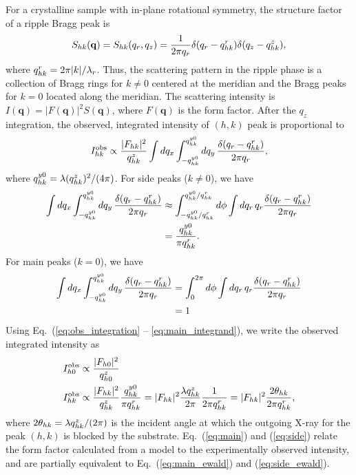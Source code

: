 For a crystalline sample with in-plane rotational symmetry, the
structure factor of a ripple Bragg peak is  
\begin{equation}
  S_{hk}(\mathbf{q}) = S_{hk}(q_r,q_z) 
  = \frac{1}{2\pi q_r}\delta(q_r-q_{hk}^r)\delta(q_z-q_{hk}^z),
\end{equation} 
where $q_{hk}^r=2\pi |k|/\lambda_r$. Thus, the scattering pattern in the 
ripple phase is a 
collection of Bragg rings for $k\neq 0$ centered at the meridian and the 
Bragg peaks for $k=0$ located along the meridian.  
The scattering intensity is $I(\mathbf{q})=|F(\mathbf{q})|^2S(\mathbf{q})$,
where $F(\mathbf{q})$ is the form factor. After the $q_z$ integration,
the observed, integrated intensity of $(h,k)$ peak is proportional to
\begin{equation}
  I_{hk}^\textrm{obs} 
    \propto \frac{\lvert F_{hk} \rvert^2}{q_{hk}^z} \int\mathop{dq_x} 
            \int_{-q_{hk}^{y0}}^{q_{hk}^{y0}}
            \mathop{dq_y} \frac{\delta(q_r-q_{hk}^r)}{2\pi q_r},
  \label{eq:obs_integration}
\end{equation}
where $q_{hk}^{y0} = \lambda (q_{hk}^z)^2/(4\pi)$.
For side peaks ($k \neq 0$), we have 
\begin{align}
  \int\mathop{dq_x} \int_{-q_{hk}^{y0}}^{q_{hk}^{y0}}\mathop{dq_y} \frac{\delta(q_r-q_{hk}^r)}{2\pi q_r}
  &\approx \int_{-q_{hk}^{y0}/q_{hk}^r}^{q_{hk}^{y0}/q_{hk}^r} \mathop{d\phi} 
          \int \mathop{dq_r} q_r\frac{\delta(q_r-q_{hk}^r)}{2\pi q_r} \nonumber\\
  &= \frac{q_{hk}^{y0}}{\pi q_{hk}^r}. 
  \label{eq:side_integrand}
\end{align}
For main peaks ($k=0$), we have 
\begin{align}
  \int\mathop{dq_x} \int_{-q_{hk}^{y0}}^{q_{hk}^{y0}}\mathop{dq_y} \frac{\delta(q_r-q_{hk}^r)}{2\pi q_r}
  &= \int_0^{2\pi}\mathop{d\phi} \int\mathop{dq_r} q_r\frac{\delta(q_r-q_{hk}^r)}{2\pi q_r} \nonumber\\
  &= 1 
  \label{eq:main_integrand}
\end{align}
Using Eq.~(\ref{eq:obs_integration} -- \ref{eq:main_integrand}), 
we write the observed integrated intensity as
\begin{align}
  I_{h0}^\textrm{obs} &\propto \frac{|F_{h0}|^2}{q_{h0}^z} \label{eq:main}\\
  I_{hk}^\textrm{obs} &\propto \frac{|F_{hk}|^2}{q_{hk}^z} \frac{q_{hk}^{y0}}{\pi q_{hk}^r}
    = |F_{hk}|^2 \frac{\lambda q_{hk}^z}{2\pi}\frac{1}{2\pi q_{hk}^r}
    = |F_{hk}|^2 \frac{2\theta_{hk}}{2\pi q_{hk}^r}, \label{eq:side}
\end{align}
where $2\theta_{hk} = \lambda q_{hk}^z/(2\pi)$ is the incident angle at which 
the outgoing X-ray for the peak $(h,k)$ is blocked by the substrate.
Eq.~(\ref{eq:main}) and (\ref{eq:side}) relate the form factor calculated from
a model to the experimentally observed intensity, and are partially
equivalent to Eq.~(\ref{eq:main_ewald}) and (\ref{eq:side_ewald}). 

